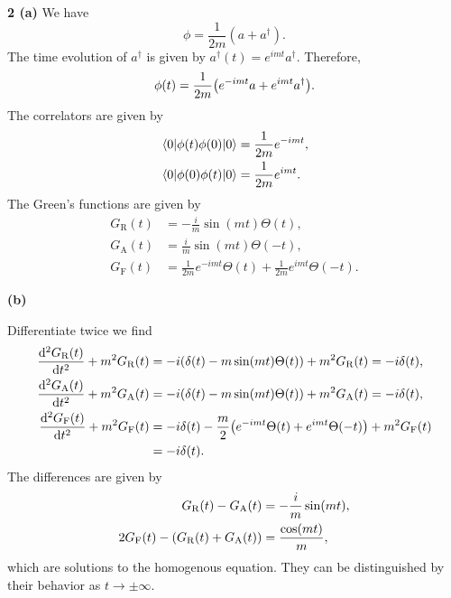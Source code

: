 \documentclass{article}
\makeatletter
\newcommand*{\shifttext}[1]{%
  \settowidth{\@tempdima}{#1}%
  \hspace{-\@tempdima}#1%
}
\newcommand{\plabel}[1]{%
\shifttext{\textbf{#1}\quad}%
}
\newcommand{\prule}{%
\begin{center}%
\hdashrule[0.5ex]{.99\linewidth}{1pt}{1pt 2.5pt}%
\end{center}%
}
\makeatother
\begin{document}
\prule

\plabel{2 (a)}%
We have
\[ \phi = \frac{1}{2m}(a + a^\dagger). \]
The time evolution of $a^\dagger$ is given by $a^\dagger(t) = e^{imt} a^\dagger$.
Therefore,
\[ \phi(t) = \frac{1}{2m}\qty(e^{-imt} a + e^{imt} a^\dagger). \]
The correlators are given by
\begin{align*}
    \ev{\phi(t)\phi(0)}{0} &= \frac{1}{2m} e^{-imt}, \\
    \ev{\phi(0)\phi(t)}{0} &= \frac{1}{2m} e^{imt}.
\end{align*}
The Green's functions are given by
\begin{align*}
    G_{\mathrm{R}}(t) &= -\frac{i}{m}\sin(mt) \Theta(t), \\
    G_{\mathrm{A}}(t) &= \frac{i}{m}\sin(mt) \Theta(-t), \\
    G_{\mathrm{F}}(t) &= \frac{1}{2m} e^{-imt}\Theta(t) + \frac{1}{2m} e^{imt} \Theta(-t).
\end{align*}

\plabel{(b)}
Differentiate twice we find
\begin{align*}
    \dv[2]{G_{\mathrm{R}}(t)}{t} + m^2 G_{\mathrm{R}}(t) &= -i(\delta(t) - m \sin(mt)\Theta(t)) + m^2 G_{\mathrm{R}}(t) = -i\delta(t), \\
    \dv[2]{G_{\mathrm{A}}(t)}{t} + m^2 G_{\mathrm{A}}(t) &= -i(\delta(t) - m \sin(mt)\Theta(t)) + m^2 G_{\mathrm{A}}(t) = -i\delta(t), \\
    \dv[2]{G_{\mathrm{F}}(t)}{t} + m^2 G_{\mathrm{F}}(t) &= -i\delta(t) - \frac{m}{2}\qty(e^{-imt}\Theta(t) + e^{imt}\Theta(-t)) + m^2 G_{\mathrm{F}}(t) \\ &= -i\delta(t).
\end{align*}
The differences are given by
\begin{align*}
    G_{\mathrm{R}}(t) - G_{\mathrm{A}}(t) &= -\frac{i}{m}\sin(mt), \\
    2G_{\mathrm{F}}(t) - \qty(G_{\mathrm{R}}(t) + G_{\mathrm{A}}(t)) &= \frac{\cos(mt)}{m},
\end{align*}
which are solutions to the homogenous equation.
{\color{red}They can be distinguished by their behavior as $t\rightarrow\pm\infty$.}
\end{document}
